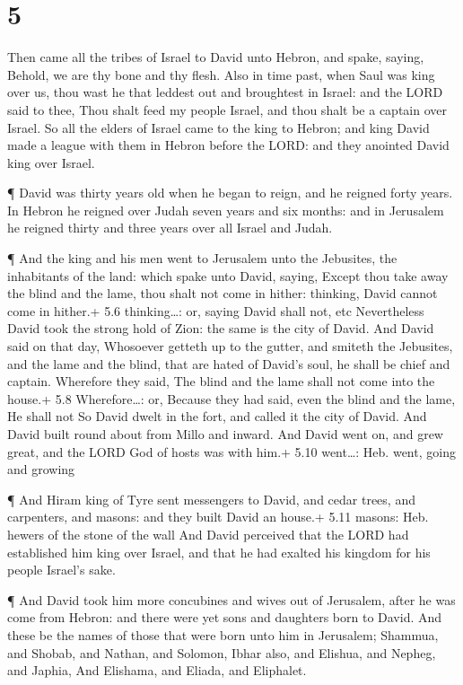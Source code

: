 \hypertarget{section-4}{%
\section{5}\label{section-4}}

 Then came all the tribes of Israel to David unto Hebron,
and spake, saying, Behold, we are thy bone and thy flesh. 
Also in time past, when Saul was king over us, thou wast he that leddest
out and broughtest in Israel: and the LORD said to thee, Thou shalt feed
my people Israel, and thou shalt be a captain over Israel. 
So all the elders of Israel came to the king to Hebron; and king David
made a league with them in Hebron before the LORD: and they anointed
David king over Israel.

 ¶ David was thirty years old when he began to reign, and he
reigned forty years.  In Hebron he reigned over Judah seven
years and six months: and in Jerusalem he reigned thirty and three years
over all Israel and Judah.

 ¶ And the king and his men went to Jerusalem unto the
Jebusites, the inhabitants of the land: which spake unto David, saying,
Except thou take away the blind and the lame, thou shalt not come in
hither: thinking, David cannot come in hither.+ 5.6 thinking\ldots: or,
saying David shall not, etc  Nevertheless David took the
strong hold of Zion: the same is the city of David.  And
David said on that day, Whosoever getteth up to the gutter, and smiteth
the Jebusites, and the lame and the blind, that are hated of David's
soul, he shall be chief and captain. Wherefore they said, The blind and
the lame shall not come into the house.+ 5.8 Wherefore\ldots: or,
Because they had said, even the blind and the lame, He shall not
 So David dwelt in the fort, and called it the city of
David. And David built round about from Millo and inward. 
And David went on, and grew great, and the LORD God of hosts was with
him.+ 5.10 went\ldots: Heb. went, going and growing

 ¶ And Hiram king of Tyre sent messengers to David, and
cedar trees, and carpenters, and masons: and they built David an house.+
5.11 masons: Heb. hewers of the stone of the wall  And
David perceived that the LORD had established him king over Israel, and
that he had exalted his kingdom for his people Israel's sake.

 ¶ And David took him more concubines and wives out of
Jerusalem, after he was come from Hebron: and there were yet sons and
daughters born to David.  And these be the names of those
that were born unto him in Jerusalem; Shammua, and Shobab, and Nathan,
and Solomon,  Ibhar also, and Elishua, and Nepheg, and
Japhia,  And Elishama, and Eliada, and Eliphalet.

